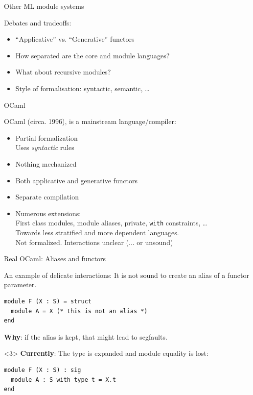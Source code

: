 \documentclass[aspectratio=169,dvipsnames,svgnames,10pt]{beamer}
\newcommand\Y{{\color{Green}{\ding{52}}}\xspace}
\newcommand\N{{\color{Red}{\ding{56}}}\xspace}
\newcommand\M{{\color{Orange}{\bf\textasciitilde}}\xspace}
\begin{document}
\begin{frame}{Other ML module systems}

  Debates and tradeoffs:
  \begin{itemize}
  \item ``Applicative'' vs. ``Generative'' functors
  \item How separated are the core and module languages?
  \item What about recursive modules?
  \item Style of formalisation: syntactic, semantic, \dots
  \end{itemize}

  
\end{frame}


\begin{frame}{OCaml}

  OCaml (circa. 1996), is a mainstream language/compiler:
  \begin{itemize}
  \item[\M] Partial formalization \citep{Leroy94,Leroy95,Leroy96}\\
    Uses \emph{syntactic} rules
  \item[\N] Nothing mechanized
  \item[\Y] Both applicative and generative functors
  \item[\Y] Separate compilation
  \item[\Y] Numerous extensions:\\
    First class modules, module aliases, private, \texttt{with} constraints, \dots\\
    Towards less stratified and more dependent languages.\\
    \N Not formalized. Interactions unclear (... or unsound)
  \end{itemize}
  
\end{frame}


\begin{frame}[fragile]{Real OCaml: Aliases and functors}

  An example of delicate interactions: It is not sound to create an alias of a functor parameter.
\begin{verbatim}
module F (X : S) = struct
  module A = X (* this is not an alias *)
end
\end{verbatim}
  {\bf Why}: if the alias is kept, that might lead to segfaults.

    \begin{onlyenv}<3>
  {\bf Currently}: The type is expanded and module equality is lost:
\begin{verbatim}
module F (X : S) : sig
  module A : S with type t = X.t
end
\end{verbatim}
\end{onlyenv}
  
\end{frame}
\end{document}
